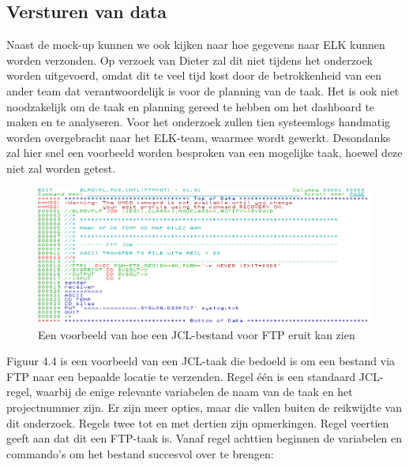 \subsection{Versturen van data}
Naast de mock-up kunnen we ook kijken naar hoe gegevens naar ELK kunnen worden verzonden. Op verzoek van Dieter zal dit niet tijdens het onderzoek worden uitgevoerd, omdat dit te veel tijd kost door de betrokkenheid van een ander team dat verantwoordelijk is voor de planning van de taak. Het is ook niet noodzakelijk om de taak en planning gereed te hebben om het dashboard te maken en te analyseren. Voor het onderzoek zullen tien systeemlogs handmatig worden overgebracht naar het ELK-team, waarmee wordt gewerkt. Desondanks zal hier snel een voorbeeld worden besproken van een mogelijke taak, hoewel deze niet zal worden getest.

\begin{figure}[h]
    \centering
    \includegraphics[width=1\linewidth]{bachproef//graphics/FTP JCL.png}
    \caption{Een voorbeeld van hoe een JCL-bestand voor FTP eruit kan zien}
    \label{fig:Een voorbeeld van hoe een JCL-bestand voor FTP eruit kan zien}
\end{figure}

Figuur 4.4 is een voorbeeld van een JCL-taak die bedoeld is om een bestand via FTP naar een bepaalde locatie te verzenden. Regel één is een standaard JCL-regel, waarbij de enige relevante variabelen de naam van de taak en het projectnummer zijn. Er zijn meer opties, maar die vallen buiten de reikwijdte van dit onderzoek. Regels twee tot en met dertien zijn opmerkingen. Regel veertien geeft aan dat dit een FTP-taak is. Vanaf regel achttien beginnen de variabelen en commando's om het bestand succesvol over te brengen:

